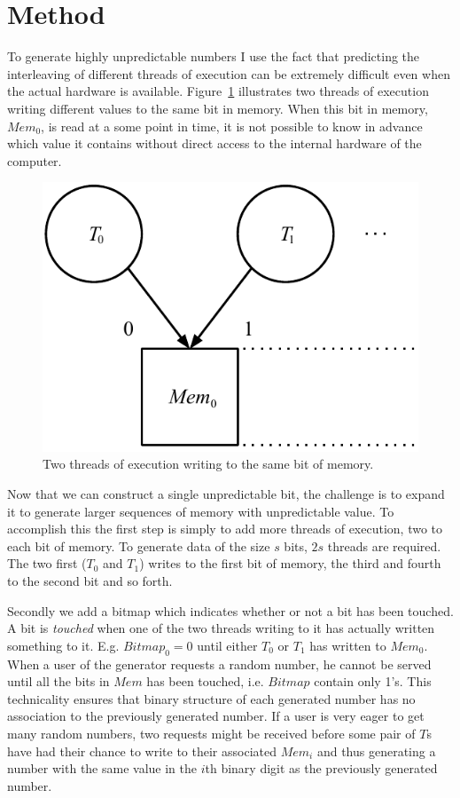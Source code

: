 \section{Method}
\label{sec:method}
To generate highly unpredictable numbers I use the fact that predicting the interleaving of different threads of execution can be extremely difficult even when the actual hardware is available.
Figure~\ref{fig:TrueRand} illustrates two threads of execution writing different values to the same bit in memory.
When this bit in memory, $Mem_0$, is read at a some point in time, it is not possible to know in advance which value it contains without direct access to the internal hardware of the computer.

\begin{figure}
	\centering
		\includegraphics[width=0.5\columnwidth]{image/TrueRand.pdf}
	\caption{Two threads of execution writing to the same bit of memory.}
	\label{fig:TrueRand}
\end{figure}

Now that we can construct a single unpredictable bit, the challenge is to expand it to generate larger sequences of memory with unpredictable value.
To accomplish this the first step is simply to add more threads of execution, two to each bit of memory.
To generate data of the size $s$ bits, $2s$ threads are required.
The two first ($T_0$ and $T_1$) writes to the first bit of memory, the third and fourth to the second bit and so forth.

Secondly we add a bitmap which indicates whether or not a bit has been touched.
A bit is \emph{touched} when one of the two threads writing to it has actually written something to it.
E.g. $Bitmap_0=0$ until either $T_0$ or $T_1$ has written to $Mem_0$.
When a user of the generator requests a random number, he cannot be served until all the bits in $Mem$ has been touched, i.e. $Bitmap$ contain only 1's.
This technicality ensures that binary structure of each generated number has no association to the previously generated number.
If a user is very eager to get many random numbers, two requests might be received before some pair of $T$s have had their chance to write to their associated $Mem_i$ and thus generating a number with the same value in the $i$th binary digit as the previously generated number.

